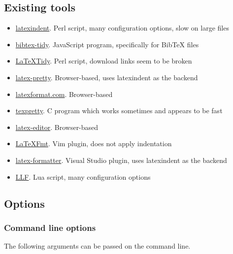 \documentclass{scrartcl}
\begin{document}
\subsection{Existing tools}\hypertarget{existing-tools}{}\label{existing-tools}

\begin{itemize}
\item{} \href{https://github.com/cmhughes/latexindent.pl}{latexindent}.
Perl script, many configuration options, slow on large files
\item{} \href{https://github.com/FlamingTempura/bibtex-tidy}{bibtex-tidy}.
JavaScript program, specifically for BibTeX files
\item{} \href{http://bfc.sfsu.edu/cgi-bin/hsu.pl?LaTeX_Tidy}{LaTeXTidy}.
Perl script, download links seem to be broken
\item{} \href{https://c.albert-thompson.com/latex-pretty/}{latex-pretty}.
Browser-based, uses latexindent as the backend
\item{} \href{https://latexformat.com/}{latexformat.com}.
Browser-based
\item{} \href{http://ftp.math.utah.edu/pub/texpretty/}{texpretty}.
C program which works sometimes and appears to be fast
\item{} \href{https://latex-editor.pages.dev/formatter/}{latex-editor}.
Browser-based
\item{} \href{https://github.com/engeljh/vim-latexfmt}{LaTeXFmt}.
Vim plugin, does not apply indentation
\item{} \href{https://github.com/nfode/latex-formatter}{latex-formatter}.
Visual Studio plugin, uses latexindent as the backend
\item{} \href{https://repo.or.cz/llf.git}{LLF}.
Lua script, many configuration options
\end{itemize}

\subsection{Options}\hypertarget{options}{}\label{options}

\subsubsection{Command line options}\hypertarget{command-line-options}{}\label{command-line-options}

The following arguments can be passed on the command line.
\end{document}

